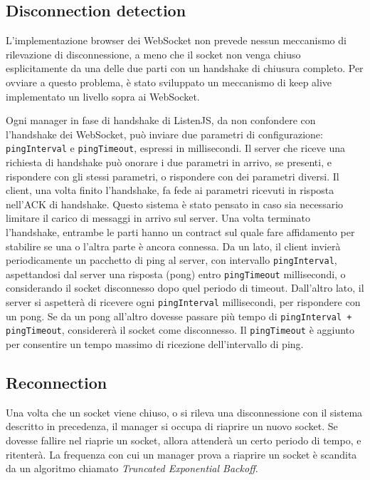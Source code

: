 \documentclass[12pt,a4paper,openright,twoside]{report}
\begin{document}
\subsection{Disconnection detection}

L'implementazione browser dei WebSocket non prevede nessun meccanismo di rilevazione di disconnessione, a meno che il socket non venga chiuso esplicitamente da una delle due parti con un handshake di chiusura completo. Per ovviare a questo problema, è stato sviluppato un meccanismo di keep alive implementato un livello sopra ai WebSocket.

\bigskip

Ogni manager in fase di handshake di ListenJS, da non confondere con l'handshake dei WebSocket, può inviare due parametri di configurazione: \lstinline{pingInterval} e \lstinline{pingTimeout}, espressi in millisecondi. Il server che riceve una richiesta di handshake può onorare i due parametri in arrivo, se presenti, e rispondere con gli stessi parametri, o rispondere con dei parametri diversi. Il client, una volta finito l'handshake, fa fede ai parametri ricevuti in risposta nell'ACK di handshake. Questo sistema è stato pensato in caso sia necessario limitare il carico di messaggi in arrivo sul server.
Una volta terminato l'handshake, entrambe le parti hanno un contract sul quale fare affidamento per stabilire se una o l'altra parte è ancora connessa.
Da un lato, il client invierà periodicamente un pacchetto di ping al server, con intervallo \lstinline{pingInterval}, aspettandosi dal server una risposta (pong) entro \lstinline{pingTimeout} millisecondi, o considerando il socket disconnesso dopo quel periodo di timeout.
Dall'altro lato, il server si aspetterà di ricevere ogni \lstinline{pingInterval} millisecondi, per rispondere con un pong. Se da un pong all'altro dovesse passare più tempo di \lstinline{pingInterval + pingTimeout}, considererà il socket come disconnesso. Il \lstinline{pingTimeout} è aggiunto per consentire un tempo massimo di ricezione dell'intervallo di ping.

\subsection{Reconnection}
Una volta che un socket viene chiuso, o si rileva una disconnessione con il sistema descritto in precedenza, il manager si occupa di riaprire un nuovo socket. Se dovesse fallire nel riaprie un socket, allora attenderà un certo periodo di tempo, e ritenterà. La frequenza con cui un manager prova a riaprire un socket è scandita da un algoritmo chiamato \textit{Truncated Exponential Backoff}.
\end{document}
